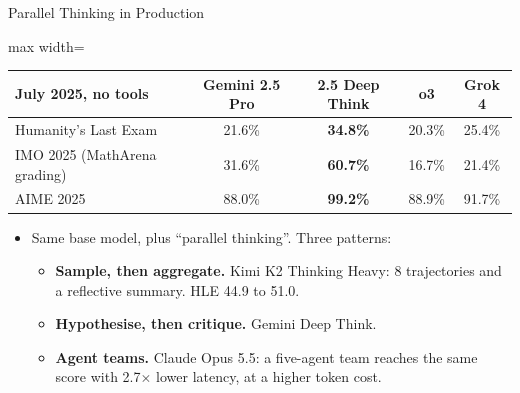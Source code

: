 \begin{frame}{Parallel Thinking in Production}
    \begin{center}
    \small
    \begin{adjustbox}{max width=\linewidth}\begin{tabular}{lcccc}
        \toprule
        \textbf{July 2025, no tools} & \textbf{Gemini 2.5 Pro} & \textbf{2.5 Deep Think} & \textbf{o3} & \textbf{Grok 4} \\
        \midrule
        Humanity's Last Exam & 21.6\% & \textbf{34.8\%} & 20.3\% & 25.4\% \\
        IMO 2025 (MathArena grading) & 31.6\% & \textbf{60.7\%} & 16.7\% & 21.4\% \\
        AIME 2025 & 88.0\% & \textbf{99.2\%} & 88.9\% & 91.7\% \\
        \bottomrule
    \end{tabular}\end{adjustbox}
    \end{center}
    \begin{itemize}\itemsep0.35em
        \item Same base model, plus ``parallel thinking''. Three patterns:
        \begin{itemize}\itemsep0.15em
            \item \textbf{Sample, then aggregate.} Kimi K2 Thinking Heavy: 8 trajectories and a reflective summary. HLE 44.9 to 51.0.
            \item \textbf{Hypothesise, then critique.} Gemini Deep Think.
            \item \textbf{Agent teams.} Claude Opus 5.5: a five-agent team reaches the same score with 2.7$\times$ lower latency, at a higher token cost.
        \end{itemize}
    \end{itemize}
    \vspace{0.05em}
\end{frame}

